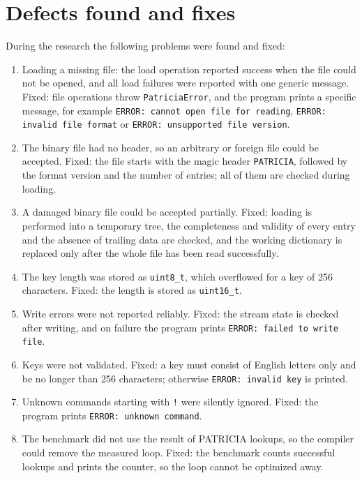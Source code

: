 \section{Defects found and fixes}

During the research the following problems were found and fixed:

\begin{enumerate}
    \item Loading a missing file: the load operation reported success when the file could not be
    opened, and all load failures were reported with one generic message. Fixed: file operations
    throw \texttt{PatriciaError}, and the program prints a specific message, for example
    \texttt{ERROR: cannot open file for reading}, \texttt{ERROR: invalid file format} or
    \texttt{ERROR: unsupported file version}.
    \item The binary file had no header, so an arbitrary or foreign file could be accepted. Fixed:
    the file starts with the magic header \texttt{PATRICIA}, followed by the format version and
    the number of entries; all of them are checked during loading.
    \item A damaged binary file could be accepted partially. Fixed: loading is performed into a
    temporary tree, the completeness and validity of every entry and the absence of trailing data
    are checked, and the working dictionary is replaced only after the whole file has been read
    successfully.
    \item The key length was stored as \texttt{uint8\_t}, which overflowed for a key of 256
    characters. Fixed: the length is stored as \texttt{uint16\_t}.
    \item Write errors were not reported reliably. Fixed: the stream state is checked after writing, and on
    failure the program prints \texttt{ERROR: failed to write file}.
    \item Keys were not validated. Fixed: a key must consist of English letters only and be no
    longer than 256 characters; otherwise \texttt{ERROR: invalid key} is printed.
    \item Unknown commands starting with \texttt{!} were silently ignored. Fixed: the program prints
    \texttt{ERROR: unknown command}.
    \item The benchmark did not use the result of PATRICIA lookups, so the compiler could remove
    the measured loop. Fixed: the benchmark counts successful lookups and prints the counter, so
    the loop cannot be optimized away.
\end{enumerate}

\pagebreak
